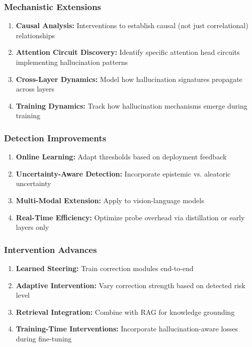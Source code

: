 \documentclass[11pt]{article}
\begin{document}
\subsubsection{Mechanistic Extensions}

\begin{enumerate}
    \item \textbf{Causal Analysis:} Interventions to establish causal (not just correlational) relationships
    \item \textbf{Attention Circuit Discovery:} Identify specific attention head circuits implementing hallucination patterns
    \item \textbf{Cross-Layer Dynamics:} Model how hallucination signatures propagate across layers
    \item \textbf{Training Dynamics:} Track how hallucination mechanisms emerge during training
\end{enumerate}

\subsubsection{Detection Improvements}

\begin{enumerate}
    \item \textbf{Online Learning:} Adapt thresholds based on deployment feedback
    \item \textbf{Uncertainty-Aware Detection:} Incorporate epistemic vs. aleatoric uncertainty
    \item \textbf{Multi-Modal Extension:} Apply to vision-language models
    \item \textbf{Real-Time Efficiency:} Optimize probe overhead via distillation or early layers only
\end{enumerate}

\subsubsection{Intervention Advances}

\begin{enumerate}
    \item \textbf{Learned Steering:} Train correction modules end-to-end
    \item \textbf{Adaptive Intervention:} Vary correction strength based on detected risk level
    \item \textbf{Retrieval Integration:} Combine with RAG for knowledge grounding
    \item \textbf{Training-Time Interventions:} Incorporate hallucination-aware losses during fine-tuning
\end{enumerate}
\end{document}
